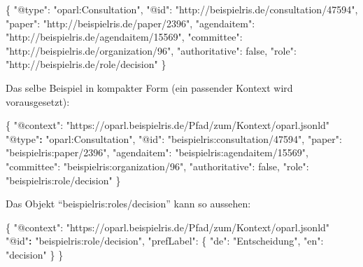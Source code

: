 \documentclass[,a4paper]{article}
\newenvironment{Shaded}{}{}
\newcommand{\DataTypeTok}[1]{\textcolor[rgb]{0.56,0.13,0.00}{{#1}}}
\newcommand{\DecValTok}[1]{\textcolor[rgb]{0.25,0.63,0.44}{{#1}}}
\newcommand{\StringTok}[1]{\textcolor[rgb]{0.25,0.44,0.63}{{#1}}}
\newcommand{\ErrorTok}[1]{\textcolor[rgb]{1.00,0.00,0.00}{\textbf{{#1}}}}
\newcommand{\NormalTok}[1]{{#1}}
\begin{document}
\begin{Shaded}
\begin{Highlighting}[]
\NormalTok{\{}
    \DataTypeTok{"@type"}\NormalTok{: }\StringTok{"oparl:Consultation"}\NormalTok{,}
    \DataTypeTok{"@id"}\NormalTok{: }\StringTok{"http://beispielris.de/consultation/47594"}\NormalTok{,}
    \DataTypeTok{"paper"}\NormalTok{: }\StringTok{"http://beispielris.de/paper/2396"}\NormalTok{,}
    \DataTypeTok{"agendaitem"}\NormalTok{: }\StringTok{"http://beispielris.de/agendaitem/15569"}\NormalTok{,}
    \DataTypeTok{"committee"}\NormalTok{: }\StringTok{"http://beispielris.de/organization/96"}\NormalTok{,}
    \DataTypeTok{"authoritative"}\NormalTok{: }\DecValTok{false}\NormalTok{,}
    \DataTypeTok{"role"}\NormalTok{: }\StringTok{"http://beispielris.de/role/decision"}
\NormalTok{\}}
\end{Highlighting}
\end{Shaded}

Das selbe Beispiel in kompakter Form (ein passender Kontext wird
vorausgesetzt):

\begin{Shaded}
\begin{Highlighting}[]
\NormalTok{\{}
    \DataTypeTok{"@context"}\NormalTok{: }\StringTok{"https://oparl.beispielris.de/Pfad/zum/Kontext/oparl.jsonld"}
    \StringTok{"@type"}\ErrorTok{:} \StringTok{"oparl:Consultation"}\NormalTok{,}
    \DataTypeTok{"@id"}\NormalTok{: }\StringTok{"beispielris:consultation/47594"}\NormalTok{,}
    \DataTypeTok{"paper"}\NormalTok{: }\StringTok{"beispielris:paper/2396"}\NormalTok{,}
    \DataTypeTok{"agendaitem"}\NormalTok{: }\StringTok{"beispielris:agendaitem/15569"}\NormalTok{,}
    \DataTypeTok{"committee"}\NormalTok{: }\StringTok{"beispielris:organization/96"}\NormalTok{,}
    \DataTypeTok{"authoritative"}\NormalTok{: }\DecValTok{false}\NormalTok{,}
    \DataTypeTok{"role"}\NormalTok{: }\StringTok{"beispielris:role/decision"}
\NormalTok{\}}
\end{Highlighting}
\end{Shaded}

Das Objekt ``beispielris:roles/decision'' kann so aussehen:

\begin{Shaded}
\begin{Highlighting}[]
\NormalTok{\{}
    \DataTypeTok{"@context"}\NormalTok{: }\StringTok{"https://oparl.beispielris.de/Pfad/zum/Kontext/oparl.jsonld"}
    \StringTok{"@id"}\ErrorTok{:} \StringTok{"beispielris:role/decision"}\NormalTok{,}
    \DataTypeTok{"prefLabel"}\NormalTok{: \{}
        \DataTypeTok{"de"}\NormalTok{: }\StringTok{"Entscheidung"}\NormalTok{,}
        \DataTypeTok{"en"}\NormalTok{: }\StringTok{"decision"}
    \NormalTok{\}}
\NormalTok{\}}
\end{Highlighting}
\end{Shaded}
\end{document}
